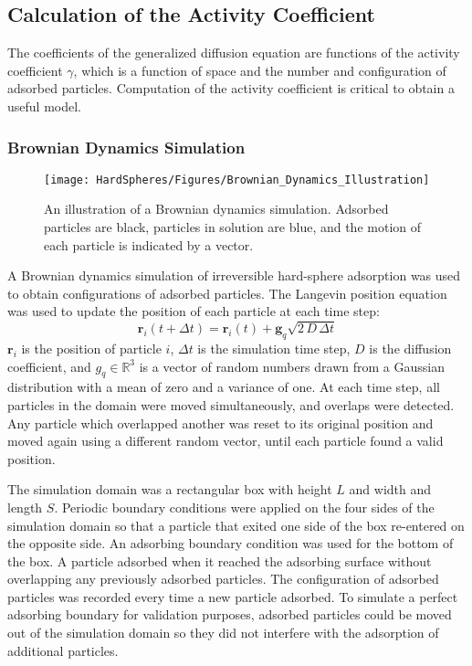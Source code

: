 \subsection{Calculation of the Activity Coefficient}

The coefficients of the generalized diffusion equation are functions
of the activity coefficient $\gamma$, which is a function of space
and the number and configuration of adsorbed particles. Computation
of the activity coefficient is critical to obtain a useful model. 


\subsubsection{Brownian Dynamics Simulation}

%
\begin{figure}
\texttt{[image: HardSpheres/Figures/Brownian\_Dynamics\_Illustration]}

\caption{\label{fig:Brownian Dynamics}An illustration of a Brownian dynamics
simulation. Adsorbed particles are black, particles in solution are
blue, and the motion of each particle is indicated by a vector.}


%
\end{figure}
A Brownian dynamics simulation of irreversible hard-sphere adsorption
was used to obtain configurations of adsorbed particles. The Langevin
position equation \cite{Elimelech1998} was used to update the position
of each particle at each time step: \begin{equation}
\mathbf{r}_{i}(t+\Delta t)=\mathbf{r}_{i}(t)+\mathbf{g}_{q}\sqrt{2\, D\,\Delta t}\label{eq:Langevin equation}\end{equation}
$\mathbf{r}_{i}$ is the position of particle $i$, $\Delta t$ is
the simulation time step, $D$ is the diffusion coefficient, and $g_{q}\in\mathbb{R}^{3}$
is a vector of random numbers drawn from a Gaussian distribution with
a mean of zero and a variance of one. At each time step, all particles
in the domain were moved simultaneously, and overlaps were detected.
Any particle which overlapped another was reset to its original position
and moved again using a different random vector, until each particle
found a valid position. 

The simulation domain was a rectangular box with height $L$ and width
and length $S$. Periodic boundary conditions were applied on the
four sides of the simulation domain so that a particle that exited
one side of the box re-entered on the opposite side. An adsorbing
boundary condition was used for the bottom of the box. A particle
adsorbed when it reached the adsorbing surface without overlapping
any previously adsorbed particles. The configuration of adsorbed particles
was recorded every time a new particle adsorbed. To simulate a perfect
adsorbing boundary for validation purposes, adsorbed particles could
be moved out of the simulation domain so they did not interfere with
the adsorption of additional particles. 

